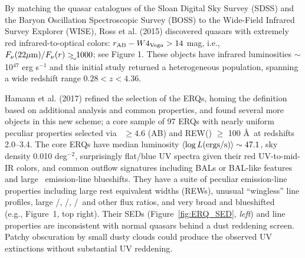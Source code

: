 \smallskip
\smallskip
\noindent
By matching the quasar catalogues of the Sloan Digital Sky Survey
(SDSS) and the Baryon Oscillation Spectroscopic Survey (BOSS) to the
Wide-Field Infrared Survey Explorer (WISE), Ross et al. (2015)
discovered quasars with extremely red infrared-to-optical colors:
$r_{\rm AB}-W4_{\rm Vega}>14$ mag, i.e., $F_\nu({\rm 22\mu
m})/F_\nu(r) \gtrsim 1000$; see Figure 1. These objects have infrared
luminosities $\sim$10$^{47}$ erg s$^{-1}$ and this initial study
returned a heterogeneous population, spanning a wide redshift range
$0.28 < z < 4.36$.

\smallskip
\smallskip
\noindent
Hamann et al. (2017) refined the selection of the ERQs, homing the
definition based on additional analysis and common properties, and
found several more objects in this new scheme;  
a core sample of 97 ERQs with nearly uniform
peculiar properties selected via \imw\ $\ge 4.6$ (AB) and REW(\civ )
$\ge$ 100 \AA\ at redshifts 2.0--3.4.  
The core ERQs have median luminosity $\left<\log L ({\rm
ergs/s})\right> \sim 47.1$, sky density 0.010 deg$^{-2}$, surprisingly
flat/blue UV spectra given their red UV-to-mid-IR colors, and common
outflow signatures including BALs or BAL-like features and large \civ\
emission-line blueshifts.  They have a suite of peculiar emission-line
properties including large rest equivalent widths (REWs), unusual
``wingless'' line profiles, large \nv /\lya , \nv /\civ , \siiv /\civ\
and other flux ratios, and very broad and blueshifted \oiii\ 
(e.g., Figure~1, top right).  Their SEDs (Figure~\ref{fig:ERQ_SED},
{\it left}) and line properties are inconsistent with normal quasars
behind a dust reddening screen. Patchy obscuration by small dusty
clouds could produce the observed UV extinctions without substantial
UV reddening.


